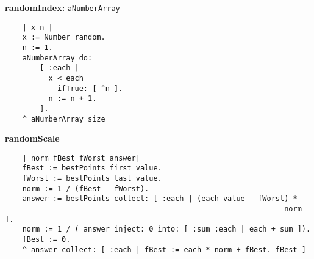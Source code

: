 {\bf randomIndex:} {\tt aNumberArray}
\begin{verbatim}
    | x n |
    x := Number random.
    n := 1.
    aNumberArray do: 
        [ :each |
          x < each
            ifTrue: [ ^n ].
          n := n + 1.
        ].
    ^ aNumberArray size  
\end{verbatim}
{\bf randomScale}
\begin{verbatim}
    | norm fBest fWorst answer|
    fBest := bestPoints first value.
    fWorst := bestPoints last value.
    norm := 1 / (fBest - fWorst).
    answer := bestPoints collect: [ :each | (each value - fWorst) * 
                                                                norm ].
    norm := 1 / ( answer inject: 0 into: [ :sum :each | each + sum ]).
    fBest := 0.
    ^ answer collect: [ :each | fBest := each * norm + fBest. fBest ]
\end{verbatim}

